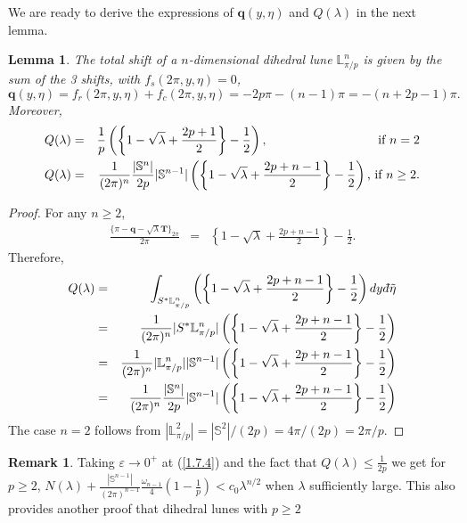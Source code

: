 \documentclass[11pt,a4paper,times]{amsart}
\theoremstyle{plain}
\newtheorem{lemma}[thm]{Lemma}
\theoremstyle{definition}
\newtheorem{remark}{Remark}[section]
\numberwithin{equation}{section}
\newcommand{\eqskip}{ \vspace*{2mm}\\ }
\newcommand{\lune}[2]{\mathbb{L}^{#1}_{#2}}
\newcommand{\dbar}{d\hspace*{-0.08em}\bar{}\hspace*{0.1em}}
\begin{document}
{ We are ready to derive the expressions of $\boldsymbol{q}(y,\eta)$ and $Q(\lambda)$ in the next lemma.
\begin{lemma} The total shift  of a $n$-dimensional dihedral lune  $\lune{n}{\pi/p}$ 
is given by the sum of the 3 shifts, with $f_s(2\pi, y,\eta)=0$, 
\begin{equation}\label{boldq}
\boldsymbol{q}(y, \eta)=f_r(2\pi, y,\eta)+ f_c(2\pi,y,\eta)=-2p\pi -(n-1)\pi=-(n+2p-1)\pi.
\end{equation}
Moreover,
\begin{eqnarray}\label{Q2}
Q(\lambda)&=& {\frac{1}{p}}\left(\left\{{1}-\sqrt{\lambda}+\frac{2p+1}{2}\right\}-\frac{1}{2}\right),
\hspace*{3cm} \mbox{ if~}n=2\\
\label{Qn}
Q(\lambda)&=&\frac{1}{(2\pi)^n} {\frac{|\mathbb{S}^n|}{2p}}|\mathbb{S}^{n-1}|\left(\left\{{1}-\sqrt{\lambda}+\frac{2p+n-1}{2}\right\}-\frac{1}{2}\right)  \mbox{, if~}n\geq 2.
\end{eqnarray}
\end{lemma}
\begin{proof}
For any $n\geq 2$, 
\begin{eqnarray*}
\frac{\{\pi-\boldsymbol{q}-\sqrt{\lambda} \boldsymbol{T}\}_{2\pi}}{2\pi}&=&
\left\{ 1-\sqrt{\lambda} +\frac{2p+n-1}{2}\right\}-\frac{1}{2}.
\end{eqnarray*}
Therefore,
\begin{eqnarray*}
Q(\lambda)&=&
\int_{S^*\mathbb{L}^n_{\pi/p}}\left(\left\{{1}-\sqrt{\lambda}+\frac{2p+n-1}{2}\right\}-\frac{1}{2}\right) dy{\dbar\tilde{\eta}}\eqskip
&=&\frac{1}{{(2\pi)^n}}|S^*\mathbb{L}^n_{\pi/p}|\left(\left\{{1}- \sqrt{\lambda} +\frac{2p+n-1}{2}\right\}-\frac{1}{2}\right)\nonumber \eqskip
&=&
\frac{1}{{(2\pi)^n}}|\mathbb{L}^n_{\pi/p}||\mathbb{S}^{n-1}|\left(\left\{{1}-\sqrt{\lambda}+\frac{2p+n-1}{2}\right\}-\frac{1}{2}\right)\nonumber \eqskip
&=&\frac{1}{(2\pi)^n} {\frac{|\mathbb{S}^n|}{2p}}|\mathbb{S}^{n-1}|\left(\left\{{1}-\sqrt{\lambda}+\frac{2p+n-1}{2}\right\}-\frac{1}{2}\right)
\end{eqnarray*}
The case $n=2$ follows from $|\lune{2}{\pi/p}|=|\mathbb{S}^2|/(2p)=4\pi/(2p)=2\pi/p$.
\end{proof}
%
\begin{remark}
 Taking $\varepsilon\to 0^+$ at (\ref{1.7.4}) and the fact that 
$Q(\lambda)\leq \frac{1}{2p}$  we get  for $p\geq 2$, 
$N(\lambda)+\frac{|\mathbb{S}^{n-1}|}{(2\pi)^{n-1}}\frac{\omega_{n-1}}{4}(1-\frac{1}{p})<c_0\lambda^{n/2}$
when $\lambda $ sufficiently large.  This also provides another proof that dihedral lunes with $p\geq 2$

\end{remark}}
\end{document}
